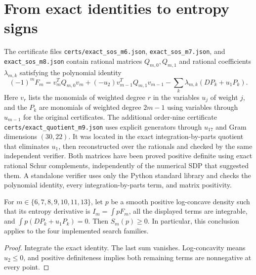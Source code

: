 \section{From exact identities to entropy signs}
The certificate files \texttt{certs/exact\_sos\_m6.json},
\texttt{exact\_sos\_m7.json}, and \texttt{exact\_sos\_m8.json} contain
rational matrices $Q_{m,0},Q_{m,1}$ and rational coefficients $\lambda_{m,k}$
satisfying the polynomial identity
\[
 (-1)^mF_m=v_m^TQ_{m,0}v_m+(-u_2)v_{m-1}^TQ_{m,1}v_{m-1}
 -\sum_k\lambda_{m,k}(DP_k+u_1P_k).
\]
Here $v_r$ lists the monomials of weighted degree $r$ in the variables
$u_j$ of weight $j$, and the $P_k$ are monomials of weighted degree $2m-1$
using variables through $u_{m-1}$ for the original certificates.
The additional order-nine certificate \texttt{certs/exact\_quotient\_m9.json}
uses explicit generators through $u_{17}$ and Gram dimensions $(30,22)$.
It was located in the exact integration-by-parts quotient that eliminates $u_1$,
then reconstructed over the rationals and checked by the same independent verifier.
Both matrices have been proved positive definite using exact rational
Schur complements, independently of the numerical SDP that suggested them.
A standalone verifier uses only the Python standard library and checks the
polynomial identity, every integration-by-parts term, and matrix positivity.

\begin{proposition}
For $m\in\{6,7,8,9,10,11,13\}$, let $p$ be a smooth positive log-concave density such
that its entropy derivative is $I_m=\int pF_m$, all the displayed terms are
integrable, and $\int p(DP_k+u_1P_k)=0$. Then $S_m(p)\ge0$.
In particular, this conclusion applies to the four implemented search families.
\end{proposition}
\begin{proof}
Integrate the exact identity. The last sum vanishes. Log-concavity means
$u_2\le0$, and positive definiteness implies both remaining terms are
nonnegative at every point.
\end{proof}

